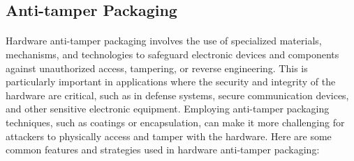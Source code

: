\subsection{Anti-tamper Packaging}
\paragraph*{}
Hardware anti-tamper packaging involves the use of specialized materials, mechanisms, and technologies to safeguard electronic devices and components against unauthorized access, tampering, or reverse engineering. This is particularly important in applications where the security and integrity of the hardware are critical, such as in defense systems, secure communication devices, and other sensitive electronic equipment. Employing anti-tamper packaging techniques, such as coatings or encapsulation, can make it more challenging for attackers to physically access and tamper with the hardware. Here are some common features and strategies used in hardware anti-tamper packaging:
